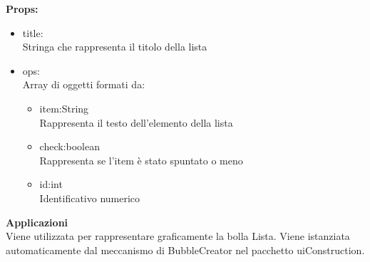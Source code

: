 \textbf{Props:} 
\begin{itemize}
\item title: 
\\
Stringa che rappresenta il titolo della lista 
\item ops: 
\\
Array di oggetti formati da:
\begin{itemize}
\item item:String
\\
Rappresenta il testo dell'elemento della lista
\item check:boolean
\\
Rappresenta se l'item è stato spuntato o meno
\item id:int
\\
Identificativo numerico
\end{itemize}


\end{itemize} 


\textbf{Applicazioni}\\
Viene utilizzata per rappresentare graficamente la bolla Lista.
Viene istanziata automaticamente dal meccanismo di BubbleCreator nel pacchetto uiConstruction. 


\clearpage

